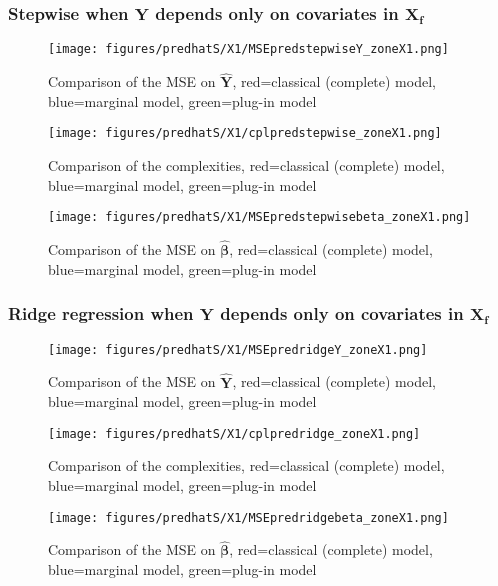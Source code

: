 \documentclass[12pt,a4paper]{report}
\begin{document}
\subsubsection{Stepwise when $\boldsymbol{Y}$ depends only on covariates in $\boldsymbol{X_f}$}

	\begin{figure}[h!]
	\centering
		  \texttt{[image: figures/predhatS/X1/MSEpredstepwiseY\_zoneX1.png]}
		\caption{Comparison of the MSE on $\hat{\boldsymbol{Y}}$, red=classical (complete) model, blue=marginal model, green=plug-in model}\label{MSEpredstepwiseY_zoneX1}
	\end{figure}
	\begin{figure}[h!]
	\centering
		  \texttt{[image: figures/predhatS/X1/cplpredstepwise\_zoneX1.png]}
		\caption{Comparison of the complexities, red=classical (complete) model, blue=marginal model, green=plug-in model}\label{cplpredstepwise_zoneX1}
	\end{figure}
	\begin{figure}[h!]
	\centering
		  \texttt{[image: figures/predhatS/X1/MSEpredstepwisebeta\_zoneX1.png]}
		\caption{Comparison of the MSE on $\hat{\boldsymbol{\beta}}$, red=classical (complete) model, blue=marginal model, green=plug-in model}\label{MSEpredstepwisebeta_zoneX1}
	\end{figure}
	\FloatBarrier
\newpage
\subsubsection{Ridge regression when $\boldsymbol{Y}$ depends only on covariates in $\boldsymbol{X_f}$}

\begin{figure}[h!]
	\centering
		  \texttt{[image: figures/predhatS/X1/MSEpredridgeY\_zoneX1.png]}
		\caption{Comparison of the MSE on $\hat{\boldsymbol{Y}}$, red=classical (complete) model, blue=marginal model, green=plug-in model}\label{MSEpredridgeY_zoneX1}
	\end{figure}
	\begin{figure}[h!]
	\centering
		  \texttt{[image: figures/predhatS/X1/cplpredridge\_zoneX1.png]}
		\caption{Comparison of the complexities, red=classical (complete) model, blue=marginal model, green=plug-in model}\label{cplpredridge_zoneX1}
	\end{figure}
	\begin{figure}[h!]
	\centering
		  \texttt{[image: figures/predhatS/X1/MSEpredridgebeta\_zoneX1.png]}
		\caption{Comparison of the MSE on $\hat{\boldsymbol{\beta}}$, red=classical (complete) model, blue=marginal model, green=plug-in model}\label{MSEpredridgebeta_zoneX1}
	\end{figure}
	\FloatBarrier
\end{document}
